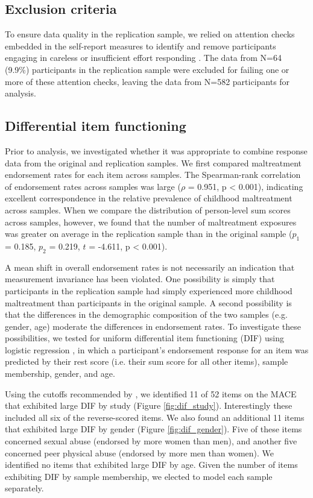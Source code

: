\documentclass[letterpaper,man,natbib,floatsintext,longtable]{apa6}
\begin{document}
\subsection{Exclusion criteria}

To ensure data quality in the replication sample, we relied on attention checks embedded in the self-report measures to identify and remove participants engaging in careless or insufficient effort responding \citep{zorowitz2021inattentive}. The data from N=64 (9.9\%)  participants in the replication sample were excluded for failing one or more of these attention checks, leaving the data from N=582 participants for analysis.

\subsection{Differential item functioning}

Prior to analysis, we investigated whether it was appropriate to combine response data from the original and replication samples. We first compared maltreatment endorsement rates for each item across samples. The Spearman-rank correlation of endorsement rates across samples was large ($\rho$ = 0.951, p < 0.001), indicating excellent correspondence in the relative prevalence of childhood maltreatment across samples. When we compare the distribution of person-level sum scores across samples,  however, we found that the number of maltreatment exposures was greater on average in the replication sample than in the original sample ($p_1$ = 0.185, $p_2$ = 0.219, $t$ = -4.611, p < 0.001). 

A mean shift in overall endorsement rates is not necessarily an indication that measurement invariance has been violated. One possibility is simply that participants in the replication sample had simply experienced more childhood maltreatment than participants in the original sample. A second possibility is that the differences in the demographic composition of the two samples (e.g. gender, age) moderate the differences in endorsement rates. To investigate these possibilities, we tested for uniform differential item functioning (DIF) using logistic regression \citep{rogers1993comparison}, in which a participant's endorsement response for an item was predicted by their rest score (i.e. their sum score for all other items), sample membership, gender, and age. 

Using the cutoffs recommended by \cite{hidalgo2014binary}, we identified 11 of 52 items on the MACE that exhibited large DIF by study (Figure \ref{fig:dif_study}). Interestingly these included all six of the reverse-scored items. We also found an additional 11 items that exhibited large DIF by gender (Figure \ref{fig:dif_gender}). Five of these items concerned sexual abuse (endorsed by more women than men), and another five concerned peer physical abuse (endorsed by more men than women). We identified no items that exhibited large DIF by age. Given the number of items exhibiting DIF by sample membership, we elected to model each sample separately.
\end{document}
